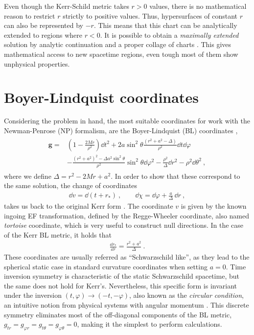 Even though the Kerr-Schild metric takes $r>0$ values, there is no mathematical reason to restrict $r$ strictly to positive values.
Thus, hypersurfaces of constant $r$ can also be represented by $-r$. 
This means that this chart can be analytically extended to regions where $r<0$.
It is possible to obtain a \emph{maximally extended} solution by analytic continuation and a proper collage of charts \cite{Townsend1997}.
This gives mathematical access to new spacetime regions, even tough most of them show unphysical properties.


\section{Boyer-Lindquist coordinates}

Considering the problem in hand, the most suitable coordinates for work with the Newman-Penrose (NP) formalism, are the Boyer-Lindquist (BL) coordinates \cite{Boyer1967},
\begin{align}
    \label{eq2:KerrBL}
    \begin{split}
        \bm{g} = & \left(1 - \frac{2 M r}{\rho^2} \right) \dd t^2 + 2 a \sin^2\theta \frac{(r^2+a^2-\Delta)}{\rho^2} \dd t \dd \varphi \\
        &- \frac{(r^2+a^2)^2- \Delta a^2 \sin^2\theta}{\rho^2} \sin^2\theta \dd\varphi^2 - \frac{\rho^2}{\Delta} \dd r^2 - \rho^2 \dd \theta^2 ~,
    \end{split}
\end{align}
where we define $\Delta=r^2-2 M r + a^2$.
In order to show that these correspond to the same solution, the change of coordinates
\begin{align}
    \label{eq2:InEFtoBL}
    \dd v = \dd ( t + r_* ) ~, \qquad \dd \chi = \dd \varphi + \frac{a}{\Delta} \,\dd r ~,
\end{align}
takes us back to the original Kerr form .
The coordinate $v$ is given by the known ingoing EF transformation, defined by the Regge-Wheeler coordinate, also named \emph{tortoise} coordinate, which is very useful to construct null directions.
In the case of the Kerr BL metric, it holds that
\begin{align}
    \label{eq2:tortoise}
    \frac{\dd r_*}{\dd r} = \frac{r^2+a^2}{\Delta} ~.
\end{align}
These coordinates are usually referred as ``Schwarzschild like'', as they lead to the spherical static case in standard curvature coordinates when setting $a=0$. 
Time inversion symmetry is characteristic of the static Schwarzschild spacetime, but the same does not hold for Kerr's.
Nevertheless, this specific form is invariant under the inversion $(t,\varphi)\to(-t,-\varphi)$, also known as the \emph{circular condition}, an intuitive notion from physical systems with angular momentum \cite{Wald2010, Heusler1996}.
This discrete symmetry eliminates most of the off-diagonal components of the BL metric, $g_{tr} = g_{\varphi r} = g_{t \theta} = g_{\varphi \theta} = 0$, making it the simplest to perform calculations.

